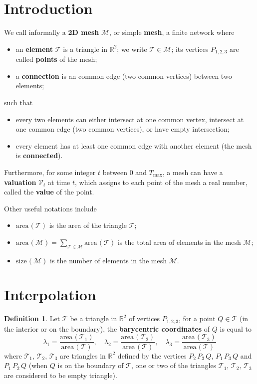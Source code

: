 \documentclass{article}
\title{}
\author{}
\date{}
\theoremstyle{definition}
\newtheorem{defn}{Definition}
\newcommand{\RR}{\mathbb{R}}
\newcommand{\MM}{\mathcal{M}}
\newcommand{\VV}{\mathcal{V}}
\newcommand{\TT}{\mathcal{T}}
\newcommand{\area}{\mathrm{area}\hspace{1pt}}
\newcommand{\size}{\mathrm{size}\hspace{1pt}}
\begin{document}
\shorthandoff{:}

\maketitle
\small
\tableofcontents\newpage
\printindex
\normalsize

\section{Introduction}
We call informally a \textbf{2D mesh} $\MM$, or simple \textbf{mesh}, a finite network where
\begin{itemize}
\item an \textbf{element} $\TT$ is a triangle in $\RR^2$; we write $\TT\in\MM$; its vertices $P_{1,2,3}$ are called \textbf{points} of the mesh;
\item a \textbf{connection} is an common edge (two common vertices) between two elements;
\end{itemize}
such that
\begin{itemize}
\item every two elements can either intersect at one common vertex, intersect at one common edge (two common vertices), or have empty intersection;
\item every element has at least one common edge with another element (the mesh is \textbf{connected}).
\end{itemize}
Furthermore, for some integer $t$ between 0 and $T_{\max}$,
a mesh can have a \textbf{valuation} $\VV_t$ at time $t$, which assigns to each point of the mesh a real number, called the \textbf{value} of the point.

Other useful notations include
\begin{itemize}
\item $\area(\TT)$ is the area of the triangle $\TT$;
\item $\area(\MM)=\sum_{\TT\in\MM}\area(\TT)$ is the total area of elements in the mesh $\MM$;
\item $\size(\MM)$ is the number of elements in the mesh $\MM$.
\end{itemize}

\section{Interpolation}
\begin{defn}
Let $\TT$ be a triangle in $\RR^2$ of vertices $P_{1,2,3}$, for a point $Q\in\TT$ (in the interior or on the boundary), the \textbf{barycentric coordinates} of $Q$ is equal to
\[\lambda_1 = \frac{\area(\TT_1)}{\area(\TT)},\quad\lambda_2 = \frac{\area(\TT_2)}{\area(\TT)},\quad\lambda_3 = \frac{\area(\TT_3)}{\area(\TT)}\]
where $\TT_1,\,\TT_2,\,\TT_3$ are triangles in $\RR^2$ defined by the vertices $P_2\,P_3\,Q$, $P_1\,P_3\,Q$ and $P_1\,P_2\,Q$
(when $Q$ is on the boundary of $\TT$, one or two of the triangles $\TT_1,\,\TT_2,\,\TT_3$ are considered to be empty triangle).
\end{defn}
\end{document}
